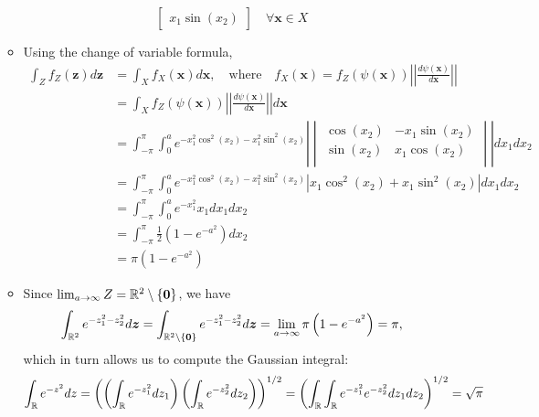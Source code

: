 \documentclass[12pt,a4paper]{article}
\begin{document}
\begin{itemize}
\begin{itemize}
\begin{equation}
\begin{bmatrix}
        x_{1}\sin(x_{2})
      \end{bmatrix}
      \quad \forall \bm{x} \in X
    \end{equation}
  \item Using the change of variable formula,
    \begin{align}
      \int_{Z}f_{Z}(\bm{z})d\bm{z}
      & = \int_{X}f_{X}(\bm{x})d\bm{x}, \quad \text{where}\quad
        f_{X}(\bm{x}) = f_{Z}(\psi(\bm{x})) \left|\left| \frac{d\psi(\bm{x})}{d\bm{x}}\right|\right|
        \nonumber \\
        & = \int_{X}f_{Z}(\psi(\bm{x})) \left|\left| \frac{d\psi(\bm{x})}{d\bm{x}}\right|\right| d\bm{x} \nonumber \\
      & = \int_{-\pi}^{\pi}\int_{0}^{a}e^{-x_{1}^{2}\cos^{2}(x_{2})-x_{1}^{2}\sin^{2}(x_{2})}
        \left|
        \begin{vmatrix}
          \cos(x_{2}) & -x_{1}\sin(x_{2}) \\
          \sin(x_{2}) & x_{1}\cos(x_{2}) \\
        \end{vmatrix}
        \right| dx_{1}dx_{2} \nonumber \\
      & = \int_{-\pi}^{\pi}\int_{0}^{a}e^{-x_{1}^{2}\cos^{2}(x_{2})-x_{1}^{2}\sin^{2}(x_{2})}
        \left| x_{1}\cos^{2}(x_{2}) + x_{1}\sin^{2}(x_{2}) \right| dx_{1}dx_{2} \nonumber \\
      & = \int_{-\pi}^{\pi}\int_{0}^{a}e^{-x_{1}^{2}}x_{1} dx_{1}dx_{2} \nonumber \\
      & = \int_{-\pi}^{\pi} \frac{1}{2}\left(1 - e^{-a^{2}}\right)  dx_{2} \nonumber \\
      & = \pi\left(1 - e^{-a^{2}}\right)
    \nonumber%
    \end{align}
  \item Since $\lim_{a\to\infty}Z=\mathbb{R}^{2}\setminus\{\bm{0}\}$, we have
    \begin{equation}\nonumber%
      \int_{\R^{2}}e^{-z_{1}^{2}-z_{2}^{2}}d\bm{z}
      =\int_{\R^{2}\setminus\{\bm{0}\}}e^{-z_{1}^{2}-z_{2}^{2}}d\bm{z}
      = \lim_{a\to\infty}\pi\left(1 - e^{-a^{2}}\right)
      = \pi,
    \end{equation}
    which in turn allows us to compute the Gaussian integral:
    \begin{equation}\label{eq:gaussianintegral}%
      \int_{\R}e^{-z^{2}}dz
      =
      \left(
      \left(\int_{\R}e^{-z_{1}^{2}}dz_{1}\right)
      \left(\int_{\R}e^{-z_{2}^{2}}dz_{2}\right)
      \right)^{1/2}
      =
      \left(
      \int_{\R}\int_{\R}e^{-z_{1}^{2}}e^{-z_{2}^{2}}dz_{1}dz_{2}
      \right)^{1/2}
      = \sqrt{\pi}
    \end{equation}
  \end{itemize}


\end{itemize}
\end{document}
